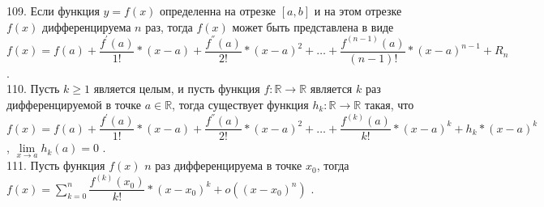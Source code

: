 \documentclass[12pt]{article}
\begin{document}
109. Если функция ${\displaystyle y=f(x)}$ определенна на отрезке ${\displaystyle [a,b]}$ и на этом отрезке ${\displaystyle f(x)}$ дифференцируема ${\displaystyle n}$ раз, тогда ${\displaystyle f(x)}$ может быть представлена в виде ${\displaystyle f(x)=f(a)+\dfrac{f^{\prime}(a)}{1!}*(x-a)+\dfrac{f^{''}(a)}{2!}*(x-a)^2+\ldots+\dfrac{f^{(n-1)}(a)}{(n-1)!}*(x-a)^{n-1}+R_n}$ .\\

110. Пусть ${\displaystyle k \geq 1}$ является целым, и пусть функция ${\displaystyle f : \mathbb{R} \rightarrow \mathbb{R}}$ является ${\displaystyle k}$ раз дифференцируемой в точке ${\displaystyle a \in \mathbb{R}}$, тогда существует функция ${\displaystyle h_k: \mathbb{R} \rightarrow \mathbb{R}}$ такая, что ${\displaystyle f(x)=f(a)+\dfrac{f^{\prime}(a)}{1!}*(x-a)+\dfrac{f^{''}(a)}{2!}*(x-a)^2+\ldots+\dfrac{f^{(k)}(a)}{k!}*(x-a)^k+h_k*(x-a)^k}$, ${\displaystyle \lim \limits _{x \to a} h_k(a)=0}$ .\\

111. Пусть функция ${\displaystyle f(x)}$ ${\displaystyle n}$ раз дифференцируема в точке ${\displaystyle x_0}$, тогда ${\displaystyle f(x)=\sum \limits _{k=0}^{n} \dfrac{f^{(k)}(x_0)}{k!}*(x-x_0)^k+o((x-x_0)^n)}$ .\\
\end{document}

